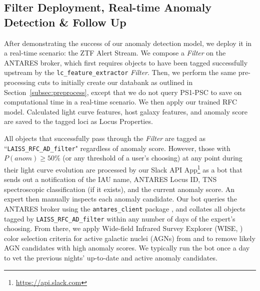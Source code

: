 \documentclass[twocolumn]{aastex63}
\newcommand{\pat}{\textcolor{purple}}
\begin{document}
\subsection{Filter Deployment, Real-time Anomaly Detection \& Follow Up} \label{subsec:follow_up}


After demonstrating the success of our anomaly detection model, we deploy it in a real-time scenario: the ZTF Alert Stream. We compose a \emph{Filter} on the ANTARES broker, which first requires objects to have been tagged successfully upstream by the \texttt{lc\_feature\_extractor} \emph{Filter}. Then, we perform the same pre-processing cuts to initially create our databank as outlined in Section~\ref{subsec:preprocess}, except that we do not query PS1-PSC to save on computational time in a real-time scenario. %
We then apply our trained RFC model. Calculated light curve features, host galaxy features, and anomaly score are saved to the tagged loci as Locus Properties. \par

All objects that successfully pass through the \emph{Filter} are tagged as ``\texttt{LAISS\_RFC\_AD\_filter}" regardless of anomaly score. However, those with $P(anom)\geq50\%$ (or any threshold of a user's choosing) at any point during their light curve evolution are processed by our Slack API App\footnote{\url{https://api.slack.com}} as a bot that sends out a notification of the IAU name, ANTARES Locus ID, TNS spectroscopic classification (if it exists), and the current anomaly score. An expert then manually inspects each anomaly candidate. Our bot queries the ANTARES broker using the \texttt{antares\_client} package \citep{Gitlab:antares-client}, and collates all objects tagged by \texttt{LAISS\_RFC\_AD\_filter} within any number of days of the expert's choosing. From there, we apply Wide-field Infrared Survey Explorer (WISE, \citealt{Wright2010}) color selection criteria for active galactic nuclei (AGNs) from \cite{Jarrett2011} and \cite{Stern2012} to remove likely AGN candidates with high anomaly scores. We typically run the bot once a day to vet the previous nights' up-to-date and active anomaly candidates. \par
\end{document}
